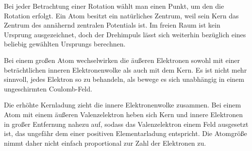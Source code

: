Bei jeder Betrachtung einer Rotation wählt man einen Punkt, um den die Rotation erfolgt. Ein Atom besitzt ein natürliches Zentrum, weil sein Kern das Zentrum des annähernd zentralen Potentials ist. Im freien Raum ist kein Ursprung ausgezeichnet, doch der Drehimpuls lässt sich weiterhin bezüglich eines beliebig gewählten Ursprungs berechnen.

\begin{classroomqa}
\end{classroomqa}

Bei einem großen Atom wechselwirken die äußeren Elektronen sowohl mit einer beträchtlichen inneren Elektronenwolke als auch mit dem Kern. Es ist nicht mehr sinnvoll, jedes Elektron so zu behandeln, als bewege es sich unabhängig in einem ungeschirmten Coulomb-Feld.

\begin{classroomqa}
\end{classroomqa}

Die erhöhte Kernladung zieht die innere Elektronenwolke zusammen. Bei einem Atom mit einem äußeren Valenzelektron heben sich Kern und innere Elektronen in großer Entfernung nahezu auf, sodass das Valenzelektron einem Feld ausgesetzt ist, das ungefähr dem einer positiven Elementarladung entspricht. Die Atomgröße nimmt daher nicht einfach proportional zur Zahl der Elektronen zu.

\begin{classroomqa}
\end{classroomqa}

